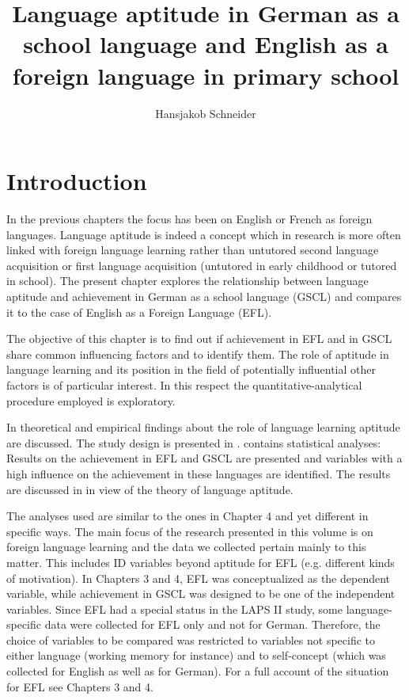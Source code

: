 \documentclass[output=paper]{langsci/langscibook}
\author{Hansjakob Schneider\affiliation{Zurich University of Teacher Education}\orcid{}}
\title[Language aptitude in German and English in primary school]
      {Language aptitude in German as a school language and English as a foreign language in primary school}
\begin{document}
\maketitle 


\section{Introduction}

In the previous chapters the focus has been on English or French as foreign languages. Language aptitude is indeed a concept which in research is more often linked with foreign language learning rather than untutored second language acquisition or first language acquisition (untutored in early childhood or tutored in school). The present chapter explores the relationship between language aptitude and achievement in German as a school language (GSCL) and compares it to the case of English as a Foreign Language (EFL).

The objective of this chapter is to find out if achievement in EFL and in GSCL share common influencing factors and to identify them. The role of aptitude in language learning and its position in the field of potentially influential other factors is of particular interest. In this respect the quantitative-analytical procedure employed is exploratory. 

In  theoretical and empirical findings about the role of language learning aptitude are discussed. The study design is presented in .  contains statistical analyses: Results on the achievement in EFL and GSCL are presented and variables with a high influence on the achievement in these languages are identified. The results are discussed in  in view of the theory of language aptitude.

The analyses used are similar to the ones in Chapter 4 and yet different in specific ways. The main focus of the research presented in this volume is on foreign language learning and the data we collected pertain mainly to this matter. This includes ID variables beyond aptitude for EFL (e.g. different kinds of motivation). In Chapters 3 and 4, EFL was conceptualized as the dependent variable, while achievement in GSCL was designed to be one of the independent variables. Since EFL had a special status in the LAPS II study, some language-specific data were collected for EFL only and not for German. Therefore, the choice of variables to be compared was restricted to variables not specific to either language (working memory for instance) and to self-concept (which was collected for English as well as for German). For a full account of the situation for EFL see Chapters 3 and 4.
\end{document}
